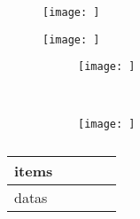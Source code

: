 \begin{figure}[!htbp]
    \centering
    \texttt{[image: ]}
    \caption{}
    \label{fig:}
\end{figure}
\begin{figure}[!htbp]
    \centering
    \texttt{[image: ]}
    \caption{}
    \label{fig:}
\end{figure}
\begin{figure}[!htbp]
    \centering
    \begin{subfigure}[b]{0.45\textwidth}
        \texttt{[image: ]}
        \caption{}
        \label{fig:}
    \end{subfigure}%
    ~%
    \begin{subfigure}[b]{0.45\textwidth}
        \texttt{[image: ]}
        \caption{}
        \label{fig:}
    \end{subfigure}
    \caption{}
    \label{fig:}
\end{figure}
\begin{table}[!htbp]
    \centering
    \begin{tabular}{lcccc}
        \hline\hline
        items \\
        \hline
        datas
        \hline\hline
    \end{tabular}
    \caption{}
    \label{tab:}
\end{table}
\medskip%
\begin{minipage}{0.45\textwidth}%
    {\footnotesize \par}
\end{minipage}
